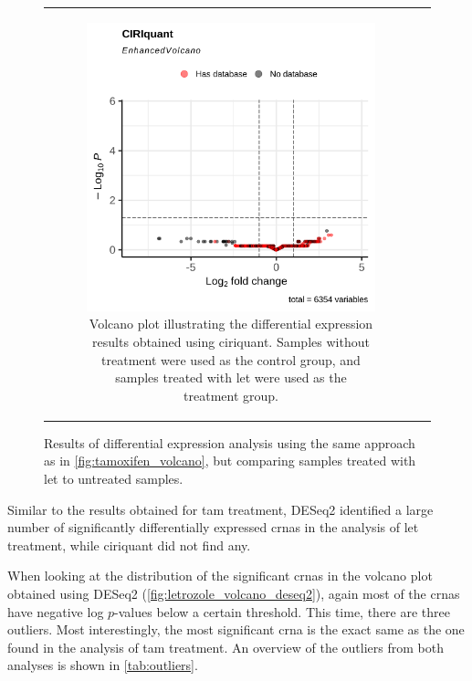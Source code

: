 \begin{figure}[H]
\begin{tabular}{cc}
\begin{subfigure}{0.5\textwidth}
            \includegraphics[width=\linewidth]{chapters/4_results_and_discussion/figures/dea/ciriquant/letrozole/volcano.png}
            \caption{Volcano plot illustrating the differential expression
                results obtained using \gls{ciriquant}.
                Samples without treatment were used as the control group, and samples treated
                with \gls{let} were used as the treatment group.
            }
            \label{fig:letrozole_volcano_ciriquant}
        \end{subfigure} &

    \end{tabular}
    \caption{Results of differential expression analysis using the same
        approach as in
        \cref{fig:tamoxifen_volcano}, but comparing samples treated with
        \gls{let}
        to untreated samples.
    }
    \label{fig:letrozole_volcano}
\end{figure}

Similar to the results obtained for \gls{tam} treatment, DESeq2 identified a
large number of significantly differentially expressed \glspl{crna} in the
analysis of \gls{let} treatment, while \gls{ciriquant} did not find any.

When looking at the distribution of the significant \glspl{crna} in the volcano
plot obtained using DESeq2 (\cref{fig:letrozole_volcano_deseq2}), again most of
the \glspl{crna} have negative log $p$-values below a certain threshold.
This time, there are three outliers.
Most interestingly, the most significant \gls{crna} is the exact same as the
one found in the analysis of \gls{tam} treatment.
An overview of the outliers from both analyses is shown in \cref{tab:outliers}.

